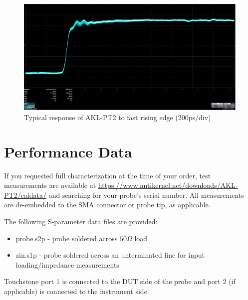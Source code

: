 \documentclass[11pt]{article}
\begin{document}
\begin{figure}[h!]
\centering
\includegraphics[width=14cm]{step-response.png}
\caption{Typical response of AKL-PT2 to fast rising edge (200ps/div)}
\label{step-response}
\end{figure}

\FloatBarrier

\pagebreak
\section{Performance Data}

If you requested full characterization at the time of your order, test measurements are available at
\url{https://www.antikernel.net/downloads/AKL-PT2/caldata/} and searching for your probe's serial number. All
measurements are de-embedded to the SMA connector or probe tip, as applicable.

The following S-parameter data files are provided:
\begin{itemize}
\item probe.s2p - probe soldered across $50 \Omega$ load
\item zin.s1p - probe soldered across an unterminated line for input loading/impedance measurements
\end{itemize}

Touchstone port 1 is connected to the DUT side of the probe and port 2 (if applicable) is connected to the instrument
side.
\end{document}
